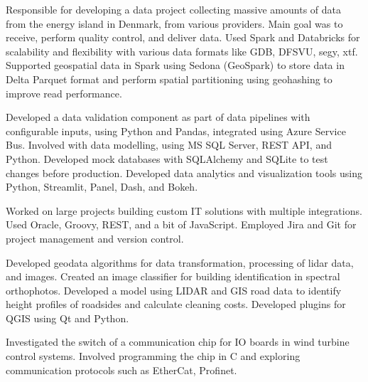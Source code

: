 Responsible for developing a data project collecting massive amounts of data from the energy island in Denmark, from various providers.
 Main goal was to receive, perform quality control, and deliver data.
 Used Spark and Databricks for scalability and flexibility with various data formats like GDB, DFSVU, segy, xtf.
 Supported geospatial data in Spark using Sedona (GeoSpark) to store data in Delta Parquet format and perform spatial partitioning using geohashing to improve read performance.

    
\divider

Developed a data validation component as part of data pipelines with configurable inputs, using Python and Pandas, integrated using Azure Service Bus.
 Involved with data modelling, using MS SQL Server, REST API, and Python.
 Developed mock databases with SQLAlchemy and SQLite to test changes before production.
 Developed data analytics and visualization tools using Python, Streamlit, Panel, Dash, and Bokeh.

             
\divider

Worked on large projects building custom IT solutions with multiple integrations.
 Used Oracle, Groovy, REST, and a bit of JavaScript.
 Employed Jira and Git for project management and version control.

      
\divider

Developed geodata algorithms for data transformation, processing of lidar data, and images.
 Created an image classifier for building identification in spectral orthophotos.
 Developed a model using LIDAR and GIS road data to identify height profiles of roadsides and calculate cleaning costs.
 Developed plugins for QGIS using Qt and Python.

       
\divider

Investigated the switch of a communication chip for IO boards in wind turbine control systems.
 Involved programming the chip in C and exploring communication protocols such as EtherCat, Profinet.

  
\divider
